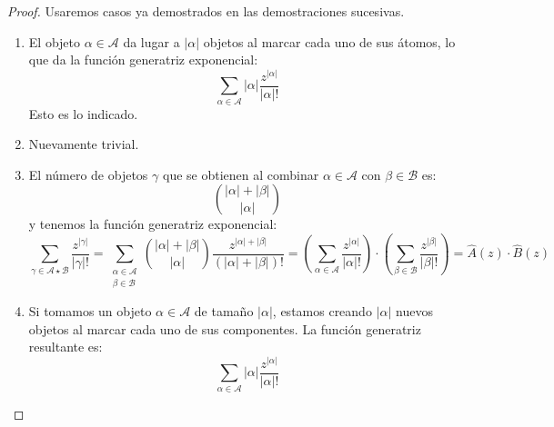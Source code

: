   \begin{proof}
    Usaremos casos ya demostrados en las demostraciones sucesivas.
    \begin{enumerate}
    \item %
      El objeto \(\alpha \in \mathcal{A}\)
      da lugar a \(\lvert \alpha \rvert\) objetos
      al marcar cada uno de sus átomos,
      lo que da la función generatriz exponencial:
      \begin{equation*}
	\sum_{\alpha \in \mathcal{A}}
	  \lvert \alpha \rvert
	    \frac{z^{\lvert \alpha \rvert}}{\lvert \alpha \rvert !}
      \end{equation*}
      Esto es lo indicado.
    \item %
      Nuevamente trivial.
    \item %
      El número de objetos \(\gamma\) que se obtienen
      al combinar \(\alpha \in \mathcal{A}\)
      con \(\beta \in \mathcal{B}\) es:
      \begin{equation*}
	\binom{\lvert \alpha \rvert + \lvert \beta \rvert}
	      {\lvert \alpha \rvert}
      \end{equation*}
      y tenemos la función generatriz exponencial:
      \begin{equation*}
	\sum_{\gamma \in \mathcal{A} \star \mathcal{B}}
	    \frac{z^{\lvert \gamma \rvert}}{\lvert \gamma \rvert !}
	  = \sum_{\substack{
		     \alpha \in \mathcal{A} \\
		     \beta \in \mathcal{B}
		 }}
	       \binom{\lvert \alpha \rvert + \lvert \beta \rvert}
		     {\lvert \alpha \rvert}
		  \frac{z^{\lvert \alpha \rvert
			    + \lvert \beta \rvert}}
		       {(\lvert \alpha \rvert
			    + \lvert \beta \rvert)!}
	  = \left(
	      \sum_{\alpha \in \mathcal{A}}
		\frac{z^{\lvert \alpha \rvert}}
		     {\lvert \alpha \rvert !}
	    \right)
	      \cdot \left(
		\sum_{\beta \in \mathcal{B}}
		  \frac{z^{\lvert \beta \rvert}}
		       {\lvert \beta \rvert !}
		    \right)
	  = \widehat{A}(z) \cdot \widehat{B}(z)
      \end{equation*}
    \item %
      Si tomamos un objeto \(\alpha \in \mathcal{A}\)
      de tamaño \(\lvert \alpha \rvert\),
      estamos creando \(\lvert \alpha \rvert\) nuevos objetos
      al marcar cada uno de sus componentes.
      La función generatriz resultante es:
      \begin{equation*}
	\sum_{\alpha \in \mathcal{A}}
	  \lvert \alpha \rvert \frac{z^{\lvert \alpha \rvert}}
				    {\lvert \alpha \rvert !}

\end{equation*}
\end{enumerate}
\end{proof}
